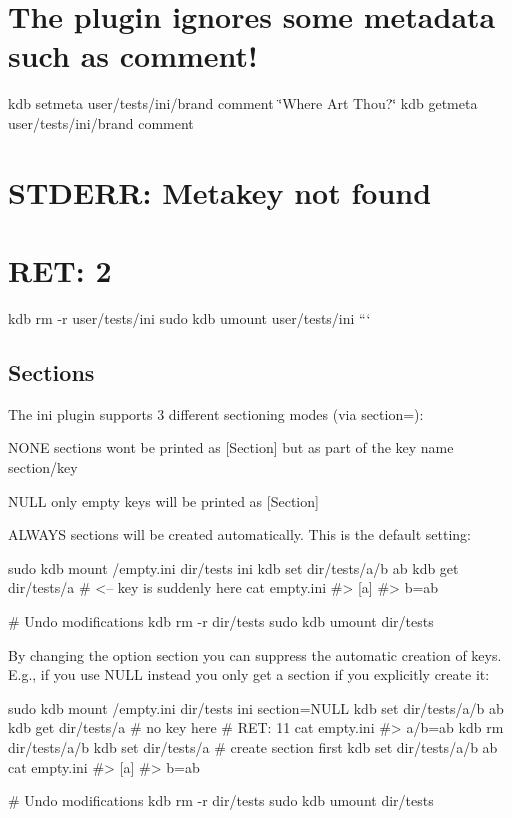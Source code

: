 \section*{The plugin ignores some metadata such as {\ttfamily comment}!}

kdb setmeta user/tests/ini/brand comment \char`\"{}\+Where Art Thou?\char`\"{} kdb getmeta user/tests/ini/brand comment \section*{S\+T\+D\+E\+RR\+: Metakey not found}

\section*{R\+ET\+: 2}

kdb rm -\/r user/tests/ini sudo kdb umount user/tests/ini ```

\subsection*{Sections}

The ini plugin supports 3 different sectioning modes (via {\ttfamily section=})\+:


\begin{DoxyItemize}
\item {\ttfamily N\+O\+NE} sections wont be printed as {\ttfamily \mbox{[}Section\mbox{]}} but as part of the key name {\ttfamily section/key}
\item {\ttfamily N\+U\+LL} only empty keys will be printed as {\ttfamily \mbox{[}Section\mbox{]}}
\item {\ttfamily A\+L\+W\+A\+YS} sections will be created automatically. This is the default setting\+:
\end{DoxyItemize}


\begin{DoxyCode}
sudo kdb mount /empty.ini dir/tests ini
kdb set dir/tests/a/b ab
kdb get dir/tests/a       # <-- key is suddenly here
cat empty.ini
#> [a]
#> b=ab

# Undo modifications
kdb rm -r dir/tests
sudo kdb umount dir/tests
\end{DoxyCode}


By changing the option {\ttfamily section} you can suppress the automatic creation of keys. E.\+g., if you use {\ttfamily N\+U\+LL} instead you only get a section if you explicitly create it\+:


\begin{DoxyCode}
sudo kdb mount /empty.ini dir/tests ini section=NULL
kdb set dir/tests/a/b ab
kdb get dir/tests/a       # no key here
# RET: 11
cat empty.ini
#> a/b=ab
kdb rm dir/tests/a/b
kdb set dir/tests/a    # create section first
kdb set dir/tests/a/b ab
cat empty.ini
#> [a]
#> b=ab

# Undo modifications
kdb rm -r dir/tests
sudo kdb umount dir/tests
\end{DoxyCode}


